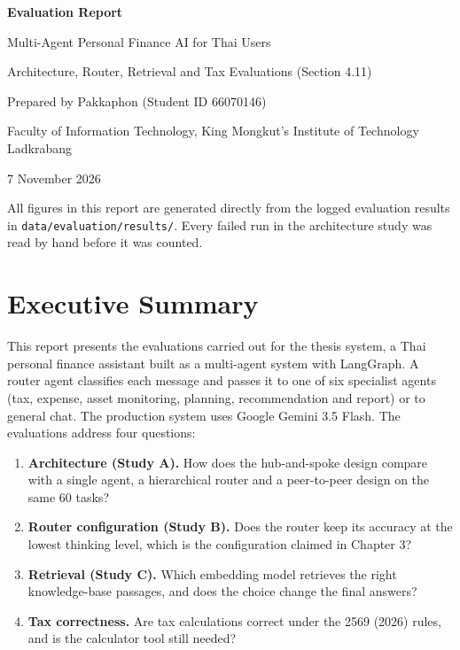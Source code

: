 \documentclass[11pt,a4paper]{article}
\begin{document}
\begin{titlepage}
\centering
\vspace*{3cm}
{\Large\bfseries Evaluation Report\par}
\vspace{0.6cm}
{\large Multi-Agent Personal Finance AI for Thai Users\par}
\vspace{0.3cm}
{\normalsize Architecture, Router, Retrieval and Tax Evaluations (Section 4.11)\par}
\vspace{2.5cm}
{\normalsize Prepared by Pakkaphon (Student ID 66070146)\par}
\vspace{0.2cm}
{\normalsize Faculty of Information Technology, King Mongkut's Institute of Technology Ladkrabang\par}
\vspace{0.2cm}
{\normalsize 7 November 2026\par}
\vfill
{\small All figures in this report are generated directly from the logged evaluation results in \texttt{data/evaluation/results/}. Every failed run in the architecture study was read by hand before it was counted.\par}
\end{titlepage}

\tableofcontents
\clearpage

\section{Executive Summary}

This report presents the evaluations carried out for the thesis system, a Thai personal finance assistant built as a multi-agent system with LangGraph. A router agent classifies each message and passes it to one of six specialist agents (tax, expense, asset monitoring, planning, recommendation and report) or to general chat. The production system uses Google Gemini 3.5 Flash. The evaluations address four questions:

\begin{enumerate}
\item \textbf{Architecture (Study A).} How does the hub-and-spoke design compare with a single agent, a hierarchical router and a peer-to-peer design on the same 60 tasks?
\item \textbf{Router configuration (Study B).} Does the router keep its accuracy at the lowest thinking level, which is the configuration claimed in Chapter 3?
\item \textbf{Retrieval (Study C).} Which embedding model retrieves the right knowledge-base passages, and does the choice change the final answers?
\item \textbf{Tax correctness.} Are tax calculations correct under the 2569 (2026) rules, and is the calculator tool still needed?
\end{enumerate}
\end{document}
